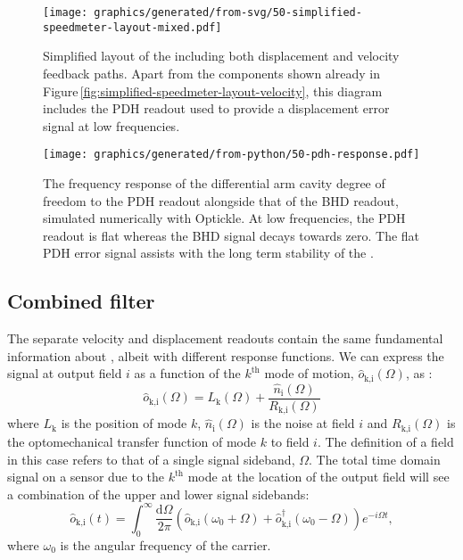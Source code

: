 \begin{figure}
  \centering
  \texttt{[image: graphics/generated/from-svg/50-simplified-speedmeter-layout-mixed.pdf]}
  \caption[Simplified layout of the \SSMEXPT{} including both displacement and velocity feedback paths]{\label{fig:simplified-speedmeter-layout-mixed}Simplified layout of the \SSMEXPT{} including both displacement and velocity feedback paths. Apart from the components shown already in Figure\,\ref{fig:simplified-speedmeter-layout-velocity}, this diagram includes the \gls{PDH} readout used to provide a displacement error signal at low frequencies.}
\end{figure}

\begin{figure}
  \centering
  \texttt{[image: graphics/generated/from-python/50-pdh-response.pdf]}
  \caption[The frequency response of the differential arm cavity degree of freedom to the Pound-Drever-Hall readout]{\label{fig:pdh-response}The frequency response of the differential arm cavity degree of freedom to the \gls{PDH} readout alongside that of the \gls{BHD} readout, simulated numerically with Optickle. At low frequencies, the \gls{PDH} readout is flat whereas the \gls{BHD} signal decays towards zero. The flat \gls{PDH} error signal assists with the long term stability of the \SSMEXPT{}.}
\end{figure}

\subsection{\label{sec:combined-filter}Combined filter}
The separate velocity and displacement readouts contain the same fundamental information about \LMINUS{}, albeit with different response functions. We can express the signal at output field $i$ as a function of the $k^{\textrm{th}}$ mode of motion, $\hat{o}_{\textrm{k,i}} \left( \Omega \right)$, as \cite{Kimble2001}:
\begin{equation}
  \label{eq:readout-signals}
  \hat{o}_{\textrm{k,i}} \left( \Omega \right) = L_{\textrm{k}}\left(\Omega\right) + \frac{\hat{n}_{\textrm{i}} \left( \Omega \right)}{R_{\textrm{k,i}} \left( \Omega \right)}
\end{equation}
where $L_{\textrm{k}}$ is the position of mode $k$, $\hat{n}_{\textrm{i}} \left( \Omega \right)$ is the noise at field $i$ and $R_{\textrm{k,i}} \left( \Omega \right)$ is the optomechanical transfer function of mode $k$ to field $i$. The definition of a field in this case refers to that of a single signal sideband, $\Omega$. The total time domain signal on a sensor due to the $k^{\textrm{th}}$ mode at the location of the output field will see a combination of the upper and lower signal sidebands:
\begin{equation}
  \hat{o}_{\textrm{k,i}} \left( t \right) = \int_{0}^{\infty} \frac{\textrm{d} \Omega}{2 \pi} \left( \hat{o}_{\textrm{k,i}} \left( \omega_{0} + \Omega \right) + \hat{o}_{\textrm{k,i}}^\dag \left( \omega_{0} - \Omega \right) \right) e^{-i \Omega t},
\end{equation}
where $\omega_{0}$ is the angular frequency of the carrier.

